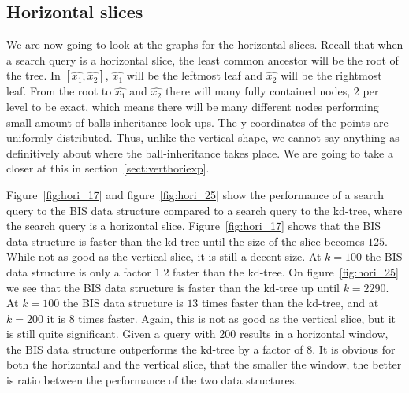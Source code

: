 \subsection{Horizontal slices}

We are now going to look at the graphs for the horizontal slices. Recall that when a search query is a horizontal slice, the least common ancestor will be the root of the tree. In $[\hat{x_1}, \hat{x_2}]$, $\hat{x_1}$ will be the leftmost leaf and $\hat{x_2}$ will be the rightmost leaf. From the root to $\hat{x_1}$ and $\hat{x_2}$ there will many fully contained nodes, $2$ per level to be exact, which means there will be many different nodes performing small amount of balls inheritance look-ups. The y-coordinates of the points are uniformly distributed. Thus, unlike the vertical shape, we cannot say anything as definitively about where the ball-inheritance takes place. We are going to take a closer at this in section~\ref{sect:verthoriexp}. 


Figure~\ref{fig:hori_17} and figure~\ref{fig:hori_25} show the performance of a search query to the BIS data structure compared to a search query to the kd-tree, where the search query is a horizontal slice. Figure~\ref{fig:hori_17} shows that the BIS data structure is faster than the kd-tree until the size of the slice becomes $125$. While not as good as the vertical slice, it is still a decent size. At $k = 100$ the BIS data structure is only a factor $1.2$ faster than the kd-tree. On figure~\ref{fig:hori_25} we see that the BIS data structure is faster than the kd-tree up until $k = 2290$. At $k = 100$ the BIS data structure is $13$ times faster than the kd-tree, and at $k = 200$ it is $8$ times faster. Again, this is not as good as the vertical slice, but it is still quite significant. Given a query with $200$ results in a horizontal window, the BIS data structure outperforms the kd-tree by a factor of $8$. It is obvious for both the horizontal and the vertical slice, that the smaller the window, the better is ratio between the performance of the two data structures.


